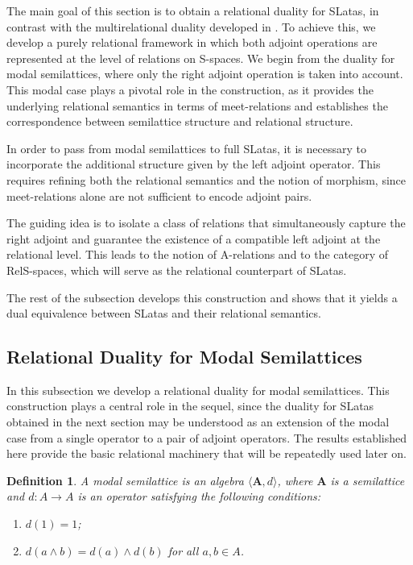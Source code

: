 \documentclass{article}
\newtheorem{definition}{\bf Definition}[section]
\begin{document}
The main goal of this section is to obtain a relational duality for SLatas, in contrast with the multirelational duality developed in \cite{GPZ}. To achieve this, we develop a purely relational framework in which both adjoint operations are represented at the level of relations on S-spaces. We begin from the duality for modal semilattices, where only the right adjoint operation is taken into account. This modal case plays a pivotal role in the construction, as it provides the underlying relational semantics in terms of meet-relations and establishes the correspondence between semilattice structure and relational structure.

In order to pass from modal semilattices to full SLatas, it is necessary to incorporate the additional structure given by the left adjoint operator. This requires refining both the relational semantics and the notion of morphism, since meet-relations alone are not sufficient to encode adjoint pairs.

The guiding idea is to isolate a class of relations that simultaneously capture the right adjoint and guarantee the existence of a compatible left adjoint at the relational level. This leads to the notion of A-relations and to the category of RelS-spaces, which will serve as the relational counterpart of SLatas.

The rest of the subsection develops this construction and shows that it yields a dual equivalence between SLatas and their relational semantics.

\subsection{Relational Duality for Modal Semilattices}

In this subsection we develop a relational duality for modal semilattices. This construction plays a central role in the sequel, since the duality for SLatas obtained in the next section may be understood as an extension of the modal case from a single operator to a pair of adjoint operators. The results established here provide the basic relational machinery that will be repeatedly used later on.

\begin{definition}
    A \textit{modal semilattice} is an algebra $\langle \mathbf{A}, d \rangle$, where $\mathbf{A}$ is a semilattice and $d: A \to A$ is an operator satisfying the following conditions:  
\begin{enumerate}
    \item $d(1) = 1$;  
    \item $d(a \wedge b) = d(a) \wedge d(b)$ for all $a, b \in A$.  
\end{enumerate}
\end{definition}
\end{document}
